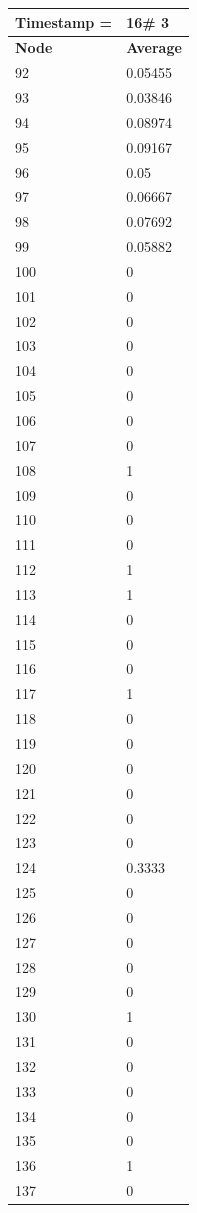 \begin{tabular}{|l||l|}
\hline
\textbf{Timestamp =} & \textbf{16}\# 3\\\hline
	\textbf{Node} & \textbf{Average} \\ \hline
\hline
	92 & 0.05455 \\ \hline
	93 & 0.03846 \\ \hline
	94 & 0.08974 \\ \hline
	95 & 0.09167 \\ \hline
	96 & 0.05 \\ \hline
	97 & 0.06667 \\ \hline
	98 & 0.07692 \\ \hline
	99 & 0.05882 \\ \hline
	100 & 0 \\ \hline
	101 & 0 \\ \hline
	102 & 0 \\ \hline
	103 & 0 \\ \hline
	104 & 0 \\ \hline
	105 & 0 \\ \hline
	106 & 0 \\ \hline
	107 & 0 \\ \hline
	108 & 1 \\ \hline
	109 & 0 \\ \hline
	110 & 0 \\ \hline
	111 & 0 \\ \hline
	112 & 1 \\ \hline
	113 & 1 \\ \hline
	114 & 0 \\ \hline
	115 & 0 \\ \hline
	116 & 0 \\ \hline
	117 & 1 \\ \hline
	118 & 0 \\ \hline
	119 & 0 \\ \hline
	120 & 0 \\ \hline
	121 & 0 \\ \hline
	122 & 0 \\ \hline
	123 & 0 \\ \hline
	124 & 0.3333 \\ \hline
	125 & 0 \\ \hline
	126 & 0 \\ \hline
	127 & 0 \\ \hline
	128 & 0 \\ \hline
	129 & 0 \\ \hline
	130 & 1 \\ \hline
	131 & 0 \\ \hline
	132 & 0 \\ \hline
	133 & 0 \\ \hline
	134 & 0 \\ \hline
	135 & 0 \\ \hline
	136 & 1 \\ \hline
	137 & 0 \\ \hline
\end{tabular}

